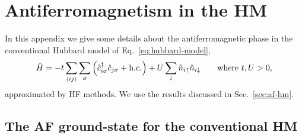 \chapter{Antiferromagnetism in the HM}\label{app:hm-af-ground-state}

In this appendix we give some details about the antiferromagnetic phase in the conventional Hubbard model of Eq.~\eqref{eq:hubbard-model},
\begin{equation}\label{appeq:hm}
	\hat H = 
	-t \sum_{\langle ij \rangle} \sum_\sigma \left(
	\hat c_{i\sigma}^\dagger \hat c_{j\sigma} + \mathrm{h.c.}
	\right)
	+ U \sum_i \hat n_{i\uparrow} \hat n_{i\downarrow}
	\qquad
	\text{where $t, U  > 0$,}
\end{equation}
approximated by HF methods. We use the results discussed in Sec.~\ref{sec:af-hm}.

\section{The AF ground-state for the conventional HM}

